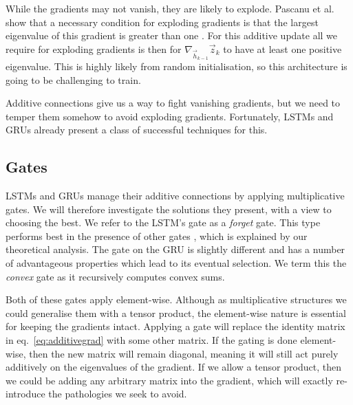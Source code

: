 While the gradients may not vanish, they are likely to explode. Pascanu et al. show that a necessary
condition for exploding gradients is that the largest
eigenvalue of this gradient is greater than one \autocite{Pascanu2012}. For this
additive update all we require for exploding gradients is then for
\(\nabla_{\vec{h}_{k-1}}\vec{z}_ k\) to have at least one positive eigenvalue. This is highly likely
 from random initialisation, so this architecture is going to be challenging to train.

Additive connections give us a way to fight vanishing gradients, but we need to temper them somehow
to avoid exploding gradients. Fortunately, LSTMs and GRUs already present a class of successful
techniques for this.


\subsection{Gates}\label{sec:gate}
LSTMs and GRUs manage their additive connections by applying multiplicative gates. We will therefore
investigate the solutions they present, with a view to choosing the best. We refer to the LSTM's gate
as a \emph{forget} gate. This type performs best
 in the presence of other gates \autocite{Greff2016, Jozefowicz2015}, which is explained by our 
 theoretical analysis.
The gate on the GRU is slightly
different and has a number of advantageous properties which lead to its eventual selection.
We term this the \emph{convex} gate as it recursively computes convex sums. 

Both of these gates apply element-wise. Although as multiplicative structures we could generalise
them with a tensor product, the element-wise nature is essential for keeping the gradients intact.
Applying a gate will replace the identity matrix in eq.~\ref{eq:additivegrad}
with some other matrix. If the gating is done element-wise, then the new matrix will remain diagonal,
meaning it will still act purely additively on the eigenvalues of the gradient. If we allow a tensor
product, then we could be adding any arbitrary matrix into the gradient, which will exactly re-introduce
the pathologies we seek to avoid.


